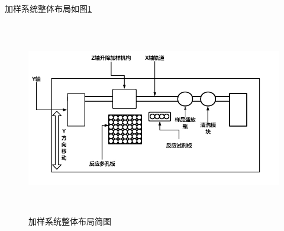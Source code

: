加样系统整体布局如图\ref{fig:3-5}
\begin{figure}[htbp!]
	\centering
	\includegraphics[height=8.5cm]{chap/figure/0.jpg}
	\caption{加样系统整体布局简图}
	\label{fig:3-5}
\end{figure}












































